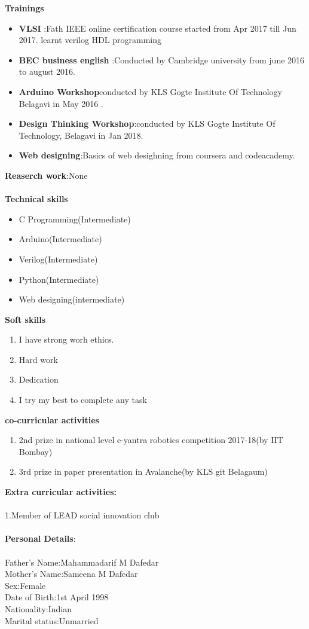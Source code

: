 \documentclass{article}
\begin{document}
\textbf{Trainings}\\[0.1cm]
\begin{itemize}
\item\textbf{ VLSI }:Fath
IEEE online certification course started from  Apr 2017 till Jun 2017.
learnt verilog HDL programming
\item\textbf{BEC business english }:Conducted by Cambridge university from june 2016 to august 2016.
\item\textbf{Arduino Workshop}conducted by KLS Gogte Institute Of Technology Belagavi in 
May 2016 .
\item\textbf{Design Thinking Workshop}:conducted by KLS Gogte Institute Of Technology, Belagavi in Jan 2018.
\item\textbf{Web designing}:Basics of web desighning from coursera and codeacademy. \\
\end{itemize}
\textbf{Reaserch work}:None\\~\\
\textbf{Technical skills}\\
\begin{itemize}
\item C Programming(Intermediate)
\item Arduino(Intermediate)
\item Verilog(Intermediate)
\item Python(Intermediate)
\item Web designing(intermediate)\\
\end{itemize}
\textbf{Soft skills} \\
\begin{enumerate}
\item I have strong worh ethics.
\item Hard work
\item Dedication
\item I try my best to complete any  task\\
\end{enumerate}
\textbf{co-curricular activities}
\begin{enumerate}
\item 2nd prize in national level e-yantra robotics competition 2017-18(by IIT Bombay)
\item 3rd prize in paper presentation in Avalanche(by KLS git Belagaum)\\
\end{enumerate}
\textbf{Extra curricular activities:}\\~\\
1.Member of LEAD social innovation club \\~\\
\textbf{Personal Details}:\\~\\
Father's Name:Mahammadarif  M Dafedar\\
Mother's Name:Sameena M Dafedar\\
Sex:Female\\
Date of Birth:1st April 1998\\
Nationality:Indian\\
Marital status:Unmarried\\~\\
\end{document}
